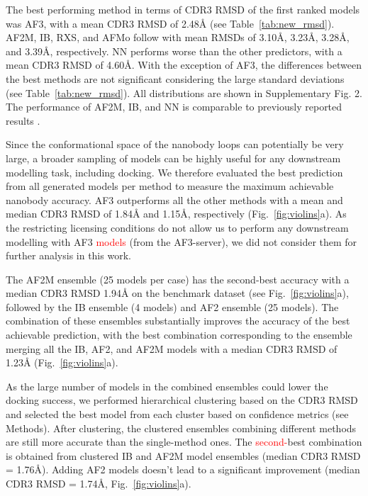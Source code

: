 \documentclass[12pt]{article}
\begin{document}
The best performing method in terms of CDR3 RMSD of the first ranked models was AF3, with a mean CDR3 RMSD of 2.48Å (see Table~\ref{tab:new_rmsd}). AF2M, IB, RXS, and AFMo follow with mean RMSDs of 3.10Å, 3.23Å, 3.28Å, and 3.39Å, respectively. NN performs worse than the other predictors, with a mean  CDR3 RMSD of 4.60Å. With the exception of AF3, the differences between the best methods are not significant considering the large standard deviations (see Table~\ref{tab:new_rmsd}). All distributions are shown in Supplementary Fig. 2. The performance of AF2M, IB, and NN is comparable to previously reported results \cite{wu2024fast, valdes2023structural, zhu2024accurate}.

Since the conformational space of the nanobody loops can potentially be very large, a broader sampling of models can be highly useful for any downstream modelling task, including docking. We therefore evaluated the best prediction from all generated models per method to measure the maximum achievable nanobody accuracy. AF3 outperforms all the other methods with a mean and median CDR3 RMSD of 1.84Å and 1.15Å, respectively (Fig.~\ref{fig:violins}a). As the restricting licensing conditions do not allow us to perform any downstream modelling with AF3 \textcolor{Red}{models} (from the AF3-server), we did not consider them for further analysis in this work.

The AF2M ensemble (25 models per case) has the second-best accuracy with a median CDR3 RMSD 1.94Å  on the benchmark dataset (see Fig.~\ref{fig:violins}a), followed by the IB ensemble (4 models) and AF2 ensemble (25 models). The combination of these ensembles substantially improves the accuracy of the best achievable prediction, with the best combination corresponding to the ensemble merging all the IB, AF2, and AF2M models with a median CDR3 RMSD of 1.23Å (Fig.~\ref{fig:violins}a). 

As the large number of models in the combined ensembles could lower the docking success, we performed hierarchical clustering based on the CDR3 RMSD and selected the best model from each cluster based on confidence metrics (see Methods). After clustering, the clustered ensembles combining different methods are still more accurate than the single-method ones. The \textcolor{Red}{second-}best combination is obtained from clustered IB and AF2M model ensembles (median CDR3 RMSD = 1.76Å). Adding AF2 models doesn't lead to a significant improvement (median CDR3 RMSD = 1.74Å, Fig.~\ref{fig:violins}a).
\end{document}
